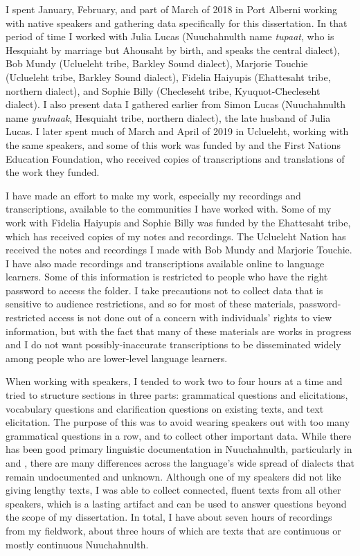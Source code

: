 I spent January, February, and part of March of 2018 in Port Alberni working with native speakers and gathering data specifically for this dissertation. In that period of time I worked with Julia Lucas (Nuuchahnulth name \textit{tupaat}, who is Hesquiaht by marriage but Ahousaht by birth, and speaks the central dialect), Bob Mundy (Uclueleht tribe, Barkley Sound dialect), Marjorie Touchie (Uclueleht tribe, Barkley Sound dialect), Fidelia Haiyupis (Ehattesaht tribe, northern dialect), and Sophie Billy (Checleseht tribe, Kyuquot-Checleseht dialect). I also present data I gathered earlier from Simon Lucas (Nuuchahnulth name \textit{yuułnaak}, Hesquiaht tribe, northern dialect), the late husband of Julia Lucas. I later spent much of March and April of 2019 in Uclueleht, working with the same speakers, and some of this work was funded by and the First Nations Education Foundation, who received copies of transcriptions and translations of the work they funded.

I have made an effort to make my work, especially my recordings and transcriptions, available to the communities I have worked with. Some of my work with Fidelia Haiyupis and Sophie Billy was funded by the Ehattesaht tribe, which has received copies of my notes and recordings. The Uclueleht Nation has received the notes and recordings I made with Bob Mundy and Marjorie Touchie. I have also made recordings and transcriptions available online to language learners. Some of this information is restricted to people who have the right password to access the folder. I take precautions not to collect data that is sensitive to audience restrictions, and so for most of these materials, password-restricted access is not done out of a concern with individuals' rights to view information, but with the fact that many of these materials are works in progress and I do not want possibly-inaccurate transcriptions to be disseminated widely among people who are lower-level language learners.

When working with speakers, I tended to work two to four hours at a time and tried to structure sections in three parts: grammatical questions and elicitations, vocabulary questions and clarification questions on existing texts, and text elicitation. The purpose of this was to avoid wearing speakers out with too many grammatical questions in a row, and to collect other important data. While there has been good primary linguistic documentation in Nuuchahnulth, particularly in \citet{sapir1939} and \citet{rose1981}, there are many differences across the language's wide spread of dialects that remain undocumented and unknown. Although one of my speakers did not like giving lengthy texts, I was able to collect connected, fluent texts from all other speakers, which is a lasting artifact and can be used to answer questions beyond the scope of my dissertation. In total, I have about seven hours of recordings from my fieldwork, about three hours of which are texts that are continuous or mostly continuous Nuuchahnulth.


